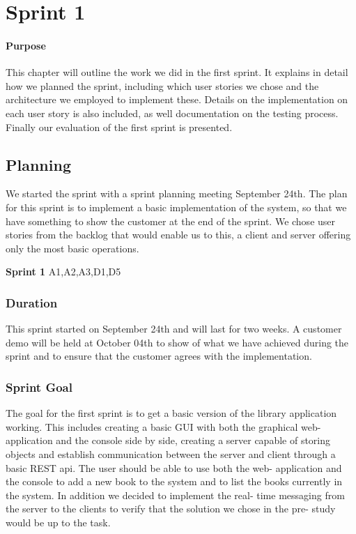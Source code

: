 \chapter{Sprint 1}

\minitoc

\subsubsection{Purpose}

This chapter will outline the work we did in the first sprint. It explains in detail how we planned the sprint, including which user stories we chose and the architecture we employed to implement these. Details on the implementation on each user story is also included, as well documentation on the testing process. Finally our evaluation of the first sprint is presented. 

\clearpage

\section{Planning}
We started the sprint with a sprint planning meeting September 24th. The plan for this sprint is to implement a basic implementation of the system, so that we have something to show the customer at the end of the sprint. We chose user stories from the backlog that would enable us to this, a client and server offering only the most basic operations. 

\textbf{Sprint 1} A1,A2,A3,D1,D5

\subsection{Duration}
This sprint started on September 24th and will last for two weeks. A customer demo will be held at October 04th to show of what we have achieved during the sprint and to ensure that the customer agrees with the implementation.

\subsection{Sprint Goal}
The goal for the first sprint is to get a basic version of the library application working. This includes creating a basic GUI with both the graphical web- application and the console side by side, creating a server capable of storing objects and establish communication between the server and client through a basic REST api. The user should be able to use both the web- application and the console to add a new book to the system and to list the books currently in the system. In addition we decided to implement the real- time messaging from the server to the clients to verify that the solution we chose in the pre- study would be up to the task.

